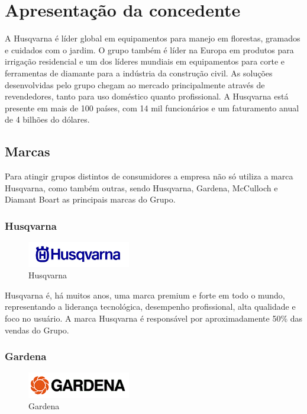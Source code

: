 \documentclass[12pt]{article}
\begin{document}
\section{Apresentação da concedente}

	A Husqvarna é líder global em equipamentos para manejo em florestas, gramados e cuidados com o jardim. O grupo também é líder na Europa em produtos para irrigação residencial e um dos líderes mundiais em equipamentos para corte e ferramentas de diamante para a indústria da construção civil. As soluções desenvolvidas pelo grupo chegam ao mercado principalmente através de revendedores, tanto para uso doméstico quanto profissional. A Husqvarna está presente em mais de 100 países, com 14 mil funcionários e um faturamento anual de 4 bilhões do dólares.

\subsection{Marcas}

	Para atingir grupos distintos de consumidores a empresa não só utiliza a marca Husqvarna, como também outras, sendo Husqvarna, Gardena, McCulloch e Diamant Boart as principais marcas do Grupo.

\subsubsection{Husqvarna}

\begin{figure}[h!]
	\centering
	\includegraphics[width=0.4\textwidth]{img/logo-husqvarna.png}
	\caption{Husqvarna}
\end{figure}

	Husqvarna é, há muitos anos, uma marca premium e forte em todo o mundo, representando a liderança tecnológica, desempenho profissional, alta qualidade e foco no usuário. A marca Husqvarna é responsável por aproximadamente 50\% das vendas do Grupo.

\subsubsection{Gardena}

\begin{figure}[h!]
	\centering
	\includegraphics[width=0.4\textwidth]{img/logo-gardena.png}
	\caption{Gardena}
\end{figure}
\end{document}
